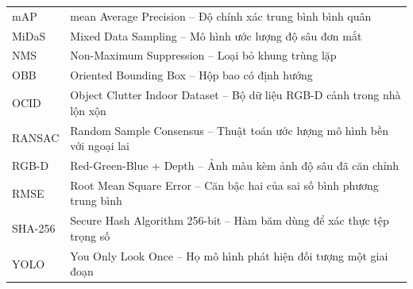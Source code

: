 \begin{longtable}{>{\centering\arraybackslash}p{3.2cm} p{10.5cm}}
    mAP & mean Average Precision -- Độ chính xác trung bình bình quân \\

    MiDaS & Mixed Data Sampling -- Mô hình ước lượng độ sâu đơn mắt \\

    NMS & Non-Maximum Suppression -- Loại bỏ khung trùng lặp \\

    OBB & Oriented Bounding Box -- Hộp bao có định hướng \\

    OCID & Object Clutter Indoor Dataset -- Bộ dữ liệu RGB-D cảnh trong nhà lộn xộn \\

    RANSAC & Random Sample Consensus -- Thuật toán ước lượng mô hình bền với ngoại lai \\

    RGB-D & Red-Green-Blue + Depth -- Ảnh màu kèm ảnh độ sâu đã căn chỉnh \\

    RMSE & Root Mean Square Error -- Căn bậc hai của sai số bình phương trung bình \\

    SHA-256 & Secure Hash Algorithm 256-bit -- Hàm băm dùng để xác thực tệp trọng số \\

    YOLO & You Only Look Once -- Họ mô hình phát hiện đối tượng một giai đoạn \\

    \bottomrule
\end{longtable}
